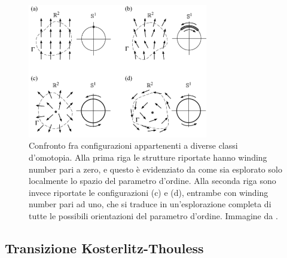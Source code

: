 \begin{figure}[H]
    \centering
    \includegraphics[width=0.7\textwidth]{Immagini/homCl_XY.png}
    \caption{Confronto fra configurazioni appartenenti a diverse classi d'omotopia. Alla prima riga le strutture riportate hanno winding 
    number pari a zero, e questo è evidenziato da come sia esplorato solo localmente lo spazio del parametro d'ordine. Alla seconda riga sono 
    invece riportate le configurazioni (c) e (d), entrambe con winding number pari ad uno, che si traduce in un'esplorazione completa di tutte le 
    possibili orientazioni del parametro d'ordine. Immagine da \cite{galliFSA}.}
    \label{fig: homCl_XY}
\end{figure}





\subsection{Transizione Kosterlitz-Thouless}


